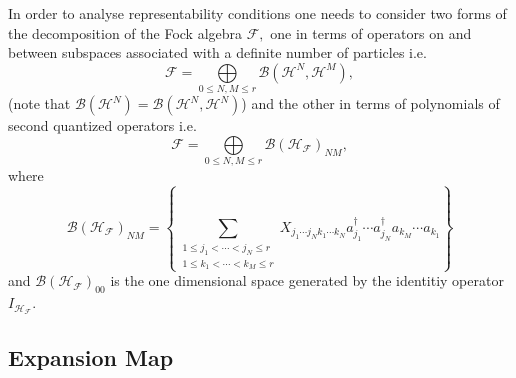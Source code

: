 \documentclass[aps,preprint]{revtex4}%
\begin{document}
In order to analyse representability conditions one needs to consider two
forms of the decomposition of the Fock algebra $\mathcal{F},$ one in terms of
operators on and between subspaces associated with a definite number of
particles i.e.
\begin{equation}
\mathcal{F}=%
{\displaystyle\bigoplus\limits_{0\leq N,M\leq r}}
\mathcal{B}\left(  \mathcal{H}^{N},\mathcal{H}^{M}\right)  ,
\end{equation}
(note that $\mathcal{B}\left(  \mathcal{H}^{N}\right)  =\mathcal{B}\left(
\mathcal{H}^{N},\mathcal{H}^{N}\right)  $) and the other in terms of
polynomials of second quantized operators i.e.
\begin{equation}
\mathcal{F}=%
{\displaystyle\bigoplus\limits_{0\leq N,M\leq r}}
\mathcal{B}\left(  \mathcal{H}_{\mathcal{F}}\right)  _{NM},
\end{equation}
where
\begin{equation}
\mathcal{B}\left(  \mathcal{H}_{\mathcal{F}}\right)  _{NM}=\left\{
\sum_{\substack{1\leq j_{1}<\cdots<j_{N}\leq r\\1\leq k_{1}<\cdots<k_{M}\leq
r}}X_{j_{1}\cdots j_{N}k_{1}\cdots k_{N}}a_{j_{1}}^{\dagger}\cdots a_{j_{N}%
}^{\dagger}a_{k_{M}}\cdots a_{k_{1}}\right\}
\end{equation}
and $\mathcal{B}\left(  \mathcal{H}_{\mathcal{F}}\right)  _{00}$ is the one
dimensional space generated by the identitiy operator $I_{\mathcal{H}%
_{\mathcal{F}}}.$

\subsection{Expansion Map \label{Expansion copy(1)}}
\end{document}
